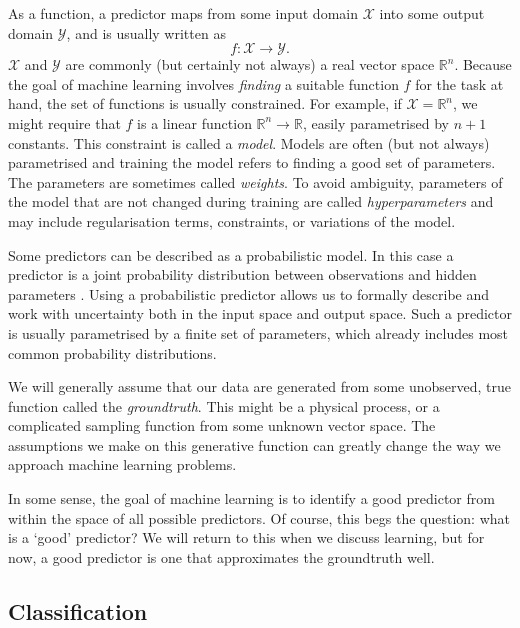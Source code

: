 \documentclass[11pt, a4paper]{book}
\newcommand{\defn}[1]{\emph{#1}}
\begin{document}
        As a function, a predictor maps from some input domain $\mathcal X$ into some output domain $\mathcal Y$, and is usually written as
        \begin{equation}
            f : \mathcal X \to \mathcal Y.
        \end{equation}
        $\mathcal X$ and $\mathcal Y$ are commonly (but certainly not always) a real vector space $\mathbb R^n$. Because the goal of machine learning involves \emph{finding} a suitable function $f$ for the task at hand, the set of functions is usually constrained. For example, if $\mathcal X = \mathbb{R}^n$, we might require that $f$ is a linear function $\mathbb R^n \to \mathbb R$, easily parametrised by $n + 1$ constants. This constraint is called a \defn{model}. Models are often (but not always) parametrised and training the model refers to finding a good set of parameters. The parameters are sometimes called \defn{weights}. To avoid ambiguity, parameters of the model that are not changed during training are called \defn{hyperparameters} and may include regularisation terms, constraints, or variations of the model.

        Some predictors can be described as a probabilistic model. In this case a predictor is a joint probability distribution between observations and hidden parameters \citep{deisenroth_mathematics_2020}. Using a probabilistic predictor allows us to formally describe and work with uncertainty both in the input space and output space. Such a predictor is usually parametrised by a finite set of parameters, which already includes most common probability distributions.

        We will generally assume that our data are generated from some unobserved, true function called the \defn{groundtruth}. This might be a physical process, or a complicated sampling function from some unknown vector space. The assumptions we make on this generative function can greatly change the way we approach machine learning problems.

        In some sense, the goal of machine learning is to identify a good predictor from within the space of all possible predictors. Of course, this begs the question: what is a `good' predictor? We will return to this when we discuss learning, but for now, a good predictor is one that approximates the groundtruth well.

    \subsection{Classification}
    \label{sec:classification}
\end{document}
